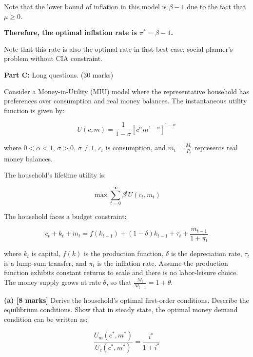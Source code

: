 Note that the lower bound of inflation in this model is $\beta - 1$ due to the fact that $\mu \geq 0$.

\textbf{Therefore, the optimal inflation rate is $\pi^* = \beta - 1$.}

Note that this rate is also the optimal rate in first best case: social planner's problem without CIA constraint.

\bigskip

\textbf{Part C:} Long questions. (30 marks)



Consider a Money-in-Utility (MIU) model where the representative household has preferences over consumption and real money balances. The instantaneous utility function is given by:

\begin{equation}
U(c, m) = \frac{1}{1-\sigma}\left[c^\alpha m^{1-\alpha}\right]^{1-\sigma}
\end{equation}

where $0 < \alpha < 1$, $\sigma > 0$, $\sigma \neq 1$, $c_t$ is consumption, and $m_t = \frac{M_t}{P_t}$ represents real money balances.

The household's lifetime utility is:

\begin{equation}
\max \sum_{t=0}^{\infty} \beta^t U(c_t, m_t)
\end{equation}

The household faces a budget constraint:

\begin{equation}
c_t + k_t + m_t = f(k_{t-1}) + (1-\delta)k_{t-1} + \tau_t + \frac{m_{t-1}}{1+\pi_t}
\end{equation}

where $k_t$ is capital, $f(k)$ is the production function, $\delta$ is the depreciation rate, $\tau_t$ is a lump-sum transfer, and $\pi_t$ is the inflation rate. Assume the production function exhibits constant returns to scale and there is no labor-leisure choice. The money supply grows at rate $\theta$, so that $\frac{M_t}{M_{t-1}} = 1 + \theta$.

\vspace{0.3cm}

\noindent\textbf{(a) [8 marks]} Derive the household's optimal first-order conditions. Describe the equilibrium conditions. Show that in steady state, the optimal money demand condition can be written as:

\begin{equation}
\frac{U_m(c^*, m^*)}{U_c(c^*, m^*)} = \frac{i^*}{1+i^*}
\end{equation}

